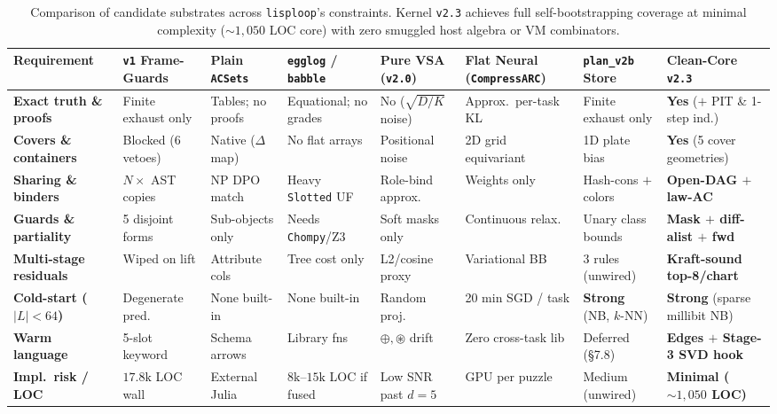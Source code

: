 \documentclass[12pt]{article}
\begin{document}
\begin{table}[htbp]
\centering
\footnotesize
\setlength{\tabcolsep}{3.1pt}
\begin{tabular}{@{}L{2.45cm}L{1.80cm}L{1.75cm}L{1.85cm}L{1.75cm}L{1.85cm}L{1.85cm}L{2.22cm}@{}}
\toprule
\textbf{Requirement} & \textbf{\texttt{v1} Frame-Guards} & \textbf{Plain \texttt{ACSets}} & \textbf{\texttt{egglog} / \texttt{babble}} & \textbf{Pure VSA (\texttt{v2.0})} & \textbf{Flat Neural (\texttt{Compress\allowbreak ARC})} & \textbf{\texttt{plan\_v2b} Store} & \textbf{Clean-Core \texttt{v2.3}} \\
\midrule
\textbf{Exact truth \& proofs} & Finite exhaust only & Tables; no proofs & Equational; no grades & No ($\sqrt{D/K}$ noise) & Approx.\ per-task KL & Finite exhaust only & \textbf{Yes} ($+$ PIT \& 1-step ind.) \\
\addlinespace[2pt]
\textbf{Covers \& containers} & Blocked (6 vetoes) & Native ($\Delta$ map) & No flat arrays & Positional noise & 2D grid equivariant & 1D plate bias & \textbf{Yes} (5 cover geometries) \\
\addlinespace[2pt]
\textbf{Sharing \& binders} & $N\times$ AST copies & NP DPO match & Heavy \texttt{Slotted} UF & Role-bind approx. & Weights only & Hash-cons $+$ colors & \textbf{Open-DAG $+$ law-AC} \\
\addlinespace[2pt]
\textbf{Guards \& partiality} & 5 disjoint forms & Sub-objects only & Needs \texttt{Chompy}/Z3 & Soft masks only & Continuous relax. & Unary class bounds & \textbf{Mask $+$ diff-alist $+$ fwd} \\
\addlinespace[2pt]
\textbf{Multi-stage residuals} & Wiped on lift & Attribute cols & Tree cost only & L2/cosine proxy & Variational BB & 3 rules (unwired) & \textbf{Kraft-sound top-8/chart} \\
\addlinespace[2pt]
\textbf{Cold-start ($|L|<64$)} & Degenerate pred. & None built-in & None built-in & Random proj. & 20 min SGD / task & \textbf{Strong} (NB, $k$-NN) & \textbf{Strong} (sparse millibit NB) \\
\addlinespace[2pt]
\textbf{Warm language} & 5-slot keyword & Schema arrows & Library fns & $\oplus,\circledast$ drift & Zero cross-task lib & Deferred (\S7.8) & \textbf{Edges $+$ Stage-3 SVD hook} \\
\addlinespace[2pt]
\textbf{Impl.\ risk / LOC} & $17.8\mathrm{k}$ LOC wall & External Julia & $8\mathrm{k}$--$15\mathrm{k}$ LOC if fused & Low SNR past $d=5$ & GPU per puzzle & Medium (unwired) & \textbf{Minimal ($\sim 1,050$ LOC)} \\
\bottomrule
\end{tabular}
\caption{Comparison of candidate substrates across \texttt{lisploop}'s constraints. Kernel \texttt{v2.3} achieves full self-bootstrapping coverage at minimal complexity ($\sim 1,050$ LOC core) with zero smuggled host algebra or VM combinators.}
\label{tab:substrates}
\end{table}
\end{document}
